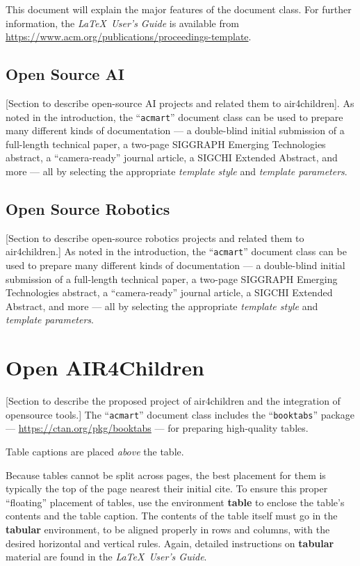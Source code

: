 \documentclass[sigconf]{acmart}
\begin{document}
This document will explain the major features of the document
class. For further information, the {\itshape \LaTeX\ User's Guide} is
available from
\url{https://www.acm.org/publications/proceedings-template}.


\subsection{Open Source AI}
[Section to describe open-source AI projects and related them to air4children].
As noted in the introduction, the ``\verb|acmart|'' document class can
be used to prepare many different kinds of documentation --- a
double-blind initial submission of a full-length technical paper, a
two-page SIGGRAPH Emerging Technologies abstract, a ``camera-ready''
journal article, a SIGCHI Extended Abstract, and more --- all by
selecting the appropriate {\itshape template style} and {\itshape
  template parameters}.

\subsection{Open Source Robotics}
[Section to describe open-source robotics projects and related them to air4children.]
As noted in the introduction, the ``\verb|acmart|'' document class can
be used to prepare many different kinds of documentation --- a
double-blind initial submission of a full-length technical paper, a
two-page SIGGRAPH Emerging Technologies abstract, a ``camera-ready''
journal article, a SIGCHI Extended Abstract, and more --- all by
selecting the appropriate {\itshape template style} and {\itshape
  template parameters}.

\section{Open AIR4Children}
[Section to describe the proposed project of air4children and the integration 
of opensource tools.]
The ``\verb|acmart|'' document class includes the ``\verb|booktabs|''
package --- \url{https://ctan.org/pkg/booktabs} --- for preparing
high-quality tables.

Table captions are placed {\itshape above} the table.

Because tables cannot be split across pages, the best placement for
them is typically the top of the page nearest their initial cite.  To
ensure this proper ``floating'' placement of tables, use the
environment \textbf{table} to enclose the table's contents and the
table caption.  The contents of the table itself must go in the
\textbf{tabular} environment, to be aligned properly in rows and
columns, with the desired horizontal and vertical rules.  Again,
detailed instructions on \textbf{tabular} material are found in the
\textit{\LaTeX\ User's Guide}.
\end{document}

